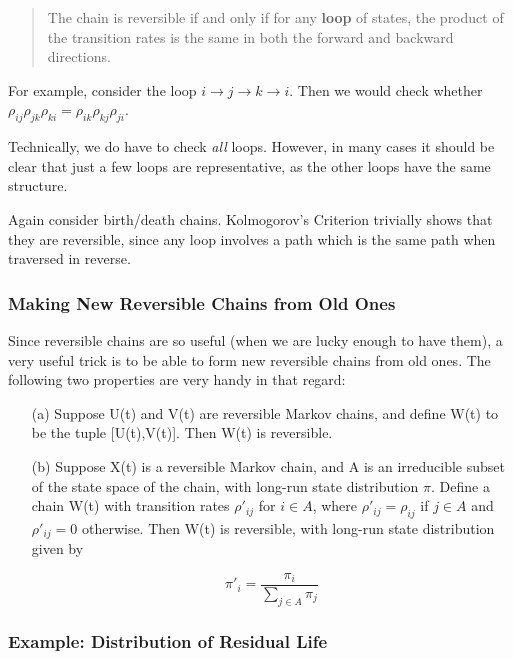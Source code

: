 \begin{quote}
The chain is reversible if and only if for any {\bf loop} of states,
the product of the transition rates is the same in both the forward and
backward directions.
\end{quote}

For example, consider the loop $i \rightarrow j \rightarrow k
\rightarrow i$.  Then we would check whether $\rho_{ij} \rho_{jk}
\rho_{ki} = \rho_{ik} \rho_{kj} \rho_{ji}$.  

Technically, we do have to check {\it all} loops.  However, in many
cases it should be clear that just a few loops are representative, as
the other loops have the same structure.

Again consider birth/death chains.  Kolmogorov's Criterion trivially
shows that they are reversible, since any loop involves a path which is
the same path when traversed in reverse.

\subsubsection{Making New Reversible Chains from Old Ones}

Since reversible chains are so useful (when we are lucky enough to have
them), a very useful trick is to be able to form new reversible chains
from old ones.  The following two properties are very handy in that
regard:

\begin{itemize}

\item [(a)] Suppose U(t) and V(t) are reversible Markov chains, and define
W(t) to be the tuple [U(t),V(t)].  Then W(t) is reversible.  

\item [(b)] Suppose X(t) is a reversible Markov chain, and A is an irreducible
subset of the state space of the chain, with long-run state distribution
$\pi$.  Define a chain W(t) with transition rates $\rho\prime_{ij}$ for
$i \in A$, where $\rho\prime_{ij} = \rho_{ij}$ if $j \in A$ and
$\rho\prime_{ij} = 0$ otherwise.  Then W(t) is reversible, with
long-run state distribution given by

\begin{equation}
\pi\prime_i = \frac{\pi_i}{\sum_{j \in A} \pi_j}
\end{equation}

\end{itemize}

\subsubsection{Example:  Distribution of Residual Life}

